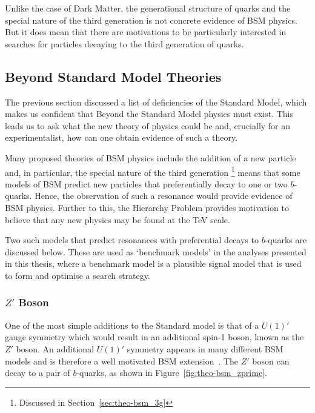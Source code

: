 Unlike the case of Dark Matter,
the generational structure of quarks
and the special nature of the third generation is not concrete evidence
of BSM physics.
But it does mean that there are motivations to be particularly interested in
searches for particles decaying to the third generation of quarks.

\newpage
\subsection{Beyond Standard Model Theories}
\label{sec:theo-bsm_models}

The previous section discussed a list of deficiencies of the Standard Model,
which makes us confident that Beyond the Standard Model physics must exist.
This leads us to ask what the new theory of physics could be
and, crucially for an experimentalist,
how can one obtain evidence of such a theory.

Many proposed theories of BSM physics include the addition of a new particle and,
in particular, the special nature of the third generation
\footnote{Discussed in Section~\ref{sec:theo-bsm_3g}}
means that some models of BSM predict new particles
that preferentially decay to one or two $b$-quarks.
Hence, the observation of such a resonance would provide evidence of BSM physics.
Further to this, the Hierarchy Problem provides motivation to believe
that any new physics may be found at the TeV scale.

Two such models that predict resonances with preferential decays to $b$-quarks
are discussed below.
These are used as `benchmark models' in the analyses presented in this thesis,
where a benchmark model is a plausible signal model 
that is used to form and optimise a search strategy.

\subsubsection{$Z'$ Boson}
\label{sec:theo-bsm_zprime}

One of the most simple additions to the Standard model is that of a $U(1)'$ gauge symmetry
which would result in an additional spin-1 boson, known as the $Z'$ boson.
An additional $U(1)'$ symmetry appears in many different BSM models and is therefore a well motivated BSM extension~\cite{theo-bsm_zprime}.
The $Z'$ boson can decay to a pair of $b$-quarks, as shown in Figure~\ref{fig:theo-bsm_zprime}.


